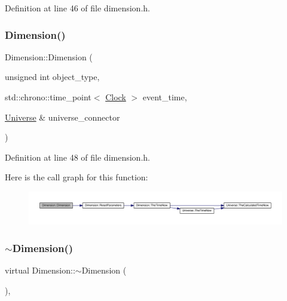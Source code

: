 Definition at line 46 of file dimension.\+h.

\mbox{\label{class_dimension_a9282c4669e8f97dce010324886d79a99}} 
\subsubsection{\texorpdfstring{Dimension()}{Dimension()}\hspace{0.1cm}{\footnotesize\ttfamily [4/4]}}
{\footnotesize\ttfamily Dimension\+::\+Dimension (\begin{DoxyParamCaption}\item[{unsigned int}]{object\+\_\+type,  }\item[{std\+::chrono\+::time\+\_\+point$<$ \mbox{\hyperlink{universe_8h_a0ef8d951d1ca5ab3cfaf7ab4c7a6fd80}{Clock}} $>$}]{event\+\_\+time,  }\item[{\mbox{\hyperlink{class_universe}{Universe}} \&}]{universe\+\_\+connector }\end{DoxyParamCaption})\hspace{0.3cm}{\ttfamily [inline]}}



Definition at line 48 of file dimension.\+h.

Here is the call graph for this function\+:\nopagebreak
\begin{figure}[H]
\begin{center}
\leavevmode
\includegraphics[width=350pt]{class_dimension_a9282c4669e8f97dce010324886d79a99_cgraph}
\end{center}
\end{figure}
\mbox{\label{class_dimension_aa990dfd442020c193a1941e9dffbfbee}} 
\subsubsection{\texorpdfstring{$\sim$\+Dimension()}{~Dimension()}}
{\footnotesize\ttfamily virtual Dimension\+::$\sim$\+Dimension (\begin{DoxyParamCaption}{ }\end{DoxyParamCaption})\hspace{0.3cm}{\ttfamily [inline]}, {\ttfamily [virtual]}}



